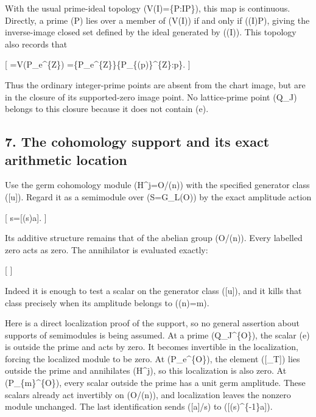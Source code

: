 \documentclass[
]{article}
\begin{document}
With the usual prime-ideal topology (V(I)=\{P:I\subseteq P\}), this map
is continuous. Directly, a prime (P) lies over a member of (V(I)) if and
only if (\varphi(I)\subseteq P), giving the inverse-image closed set
defined by the ideal generated by (\varphi(I)). This topology also
records that

{[}  =V(P\_e\^{}\{\mathbb Z\})
=\{P\_e\^{}\{\mathbb Z\}\}\cup\{P\_\{(p)\}\^{}\{\mathbb Z\}:p\}.
 {]}

Thus the ordinary integer-prime points are absent from the chart image,
but are in the closure of its supported-zero image point. No
lattice-prime point (Q\_J) belongs to this closure because it does not
contain (e).

\subsection{7. The cohomology support and its exact arithmetic
location}\label{the-cohomology-support-and-its-exact-arithmetic-location}

Use the germ cohomology module (H\^{}j=\mathcal O/(n)) with the
specified generator class ({[}u{]}). Regard it as a semimodule over
(S=G\_L(\mathcal O)) by the exact amplitude action

{[} s\cdot[a]={[}(s)a{]}.  {]}

Its additive structure remains that of the abelian group
(\mathcal O/(n)). Every labelled zero acts as zero. The annihilator is
evaluated exactly:

{[}   {]}

Indeed it is enough to test a scalar on the generator class ({[}u{]}),
and it kills that class precisely when its amplitude belongs to
((n)=\mathfrak m).

Here is a direct localization proof of the support, so no general
assertion about supports of semimodules is being assumed. At a prime
(Q\_J\^{}\{\mathcal O\}), the scalar (e) is outside the prime and acts
by zero. It becomes invertible in the localization, forcing the
localized module to be zero. At (P\_e\^{}\{\mathcal O\}), the element
({[}\tau\_T{]}) lies outside the prime and annihilates (H\^{}j), so this
localization is also zero. At (P\_\{\mathfrak m\}\^{}\{\mathcal O\}),
every scalar outside the prime has a unit germ amplitude. These scalars
already act invertibly on (\mathcal O/(n)), and localization leaves the
nonzero module unchanged. The last identification sends ({[}a{]}/s) to
({[}(s)\^{}\{-1\}a{]}).
\end{document}
